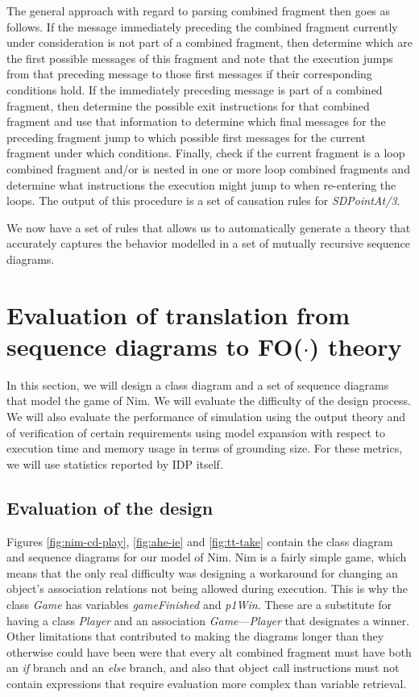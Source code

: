 \documentclass[conference]{IEEEtran}
\begin{document}
The general approach with regard to parsing combined fragment then goes as follows. If the message immediately preceding the combined fragment currently under consideration is not part of a combined fragment, then determine which are the first possible messages of this fragment and note that the execution jumps from that preceding message to those first messages if their corresponding conditions hold. If the immediately preceding message is part of a combined fragment, then determine the possible exit instructions for that combined fragment and use that information to determine which final messages for the preceding fragment jump to which possible first messages for the current fragment under which conditions. Finally, check if the current fragment is a loop combined fragment and/or is nested in one or more loop combined fragments and determine what instructions the execution might jump to when re-entering the loops. The output of this procedure is a set of causation rules for \textit{SDPointAt/3}.

We now have a set of rules that allows us to automatically generate a theory that accurately captures the behavior modelled in a set of mutually recursive sequence diagrams.

\section{Evaluation of translation from sequence diagrams to FO($\cdot$) theory}\label{sec:evaluation}

In this section, we will design a class diagram and a set of sequence diagrams that model the game of Nim. We will evaluate the difficulty of the design process. We will also evaluate the performance of simulation using the output theory and of verification of certain requirements using model expansion with respect to execution time and memory usage in terms of grounding size. For these metrics, we will use statistics reported by IDP itself.

\subsection{Evaluation of the design}
Figures \ref{fig:nim-cd-play}, \ref{fig:ahe-ie} and \ref{fig:tt-take} contain the class diagram and sequence diagrams for our model of Nim. Nim is a fairly simple game, which means that the only real difficulty was designing a workaround for changing an object's association relations not being allowed during execution. This is why the class \textit{Game} has variables \textit{gameFinished} and \textit{p1Win}. These are a substitute for having a class \textit{Player} and an association \textit{Game}---\textit{Player} that designates a winner. Other limitations that contributed to making the diagrams longer than they otherwise could have been were that every alt combined fragment must have both an \textit{if} branch and an \textit{else} branch, and also that object call instructions must not contain expressions that require evaluation more complex than variable retrieval.
\end{document}
